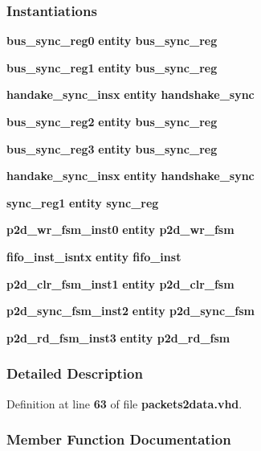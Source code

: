 \subsubsection*{Instantiations}
 \begin{DoxyCompactItemize}
\item 
{\bf bus\+\_\+sync\+\_\+reg0}  {\bfseries entity bus\+\_\+sync\+\_\+reg}   
\item 
{\bf bus\+\_\+sync\+\_\+reg1}  {\bfseries entity bus\+\_\+sync\+\_\+reg}   
\item 
{\bf handake\+\_\+sync\+\_\+insx}  {\bfseries entity handshake\+\_\+sync}   
\item 
{\bf bus\+\_\+sync\+\_\+reg2}  {\bfseries entity bus\+\_\+sync\+\_\+reg}   
\item 
{\bf bus\+\_\+sync\+\_\+reg3}  {\bfseries entity bus\+\_\+sync\+\_\+reg}   
\item 
{\bf handake\+\_\+sync\+\_\+insx}  {\bfseries entity handshake\+\_\+sync}   
\item 
{\bf sync\+\_\+reg1}  {\bfseries entity sync\+\_\+reg}   
\item 
{\bf p2d\+\_\+wr\+\_\+fsm\+\_\+inst0}  {\bfseries entity p2d\+\_\+wr\+\_\+fsm}   
\item 
{\bf fifo\+\_\+inst\+\_\+isntx}  {\bfseries entity fifo\+\_\+inst}   
\item 
{\bf p2d\+\_\+clr\+\_\+fsm\+\_\+inst1}  {\bfseries entity p2d\+\_\+clr\+\_\+fsm}   
\item 
{\bf p2d\+\_\+sync\+\_\+fsm\+\_\+inst2}  {\bfseries entity p2d\+\_\+sync\+\_\+fsm}   
\item 
{\bf p2d\+\_\+rd\+\_\+fsm\+\_\+inst3}  {\bfseries entity p2d\+\_\+rd\+\_\+fsm}   
\end{DoxyCompactItemize}


\subsubsection{Detailed Description}


Definition at line {\bf 63} of file {\bf packets2data.\+vhd}.



\subsubsection{Member Function Documentation}
